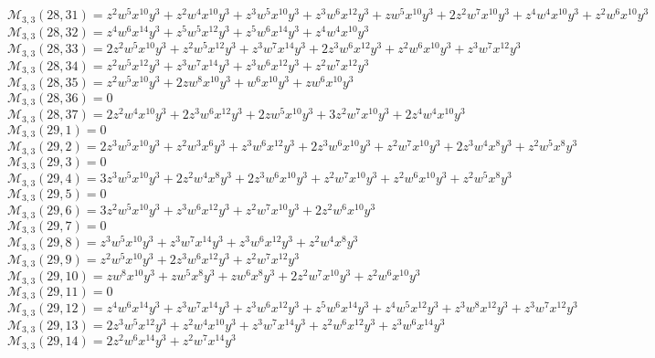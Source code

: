 \documentclass[12pt]{memoireuqam1.3}
\begin{document}
$\mathcal{M}_{3,3}(28,31)=z^2w^5x^{10}y^3+z^2w^4x^{10}y^3+z^3w^5x^{10}y^3+z^3w^6x^{12}y^3+zw^5x^{10}y^3+2z^2w^7x^{10}y^3+z^4w^4x^{10}y^3+z^2w^6x^{10}y^3$\\
$\mathcal{M}_{3,3}(28,32)=z^4w^6x^{14}y^3+z^5w^5x^{12}y^3+z^5w^6x^{14}y^3+z^4w^4x^{10}y^3$\\
$\mathcal{M}_{3,3}(28,33)=2z^2w^5x^{10}y^3+z^2w^5x^{12}y^3+z^3w^7x^{14}y^3+2z^3w^6x^{12}y^3+z^2w^6x^{10}y^3+z^3w^7x^{12}y^3$\\
$\mathcal{M}_{3,3}(28,34)=z^2w^5x^{12}y^3+z^3w^7x^{14}y^3+z^3w^6x^{12}y^3+z^2w^7x^{12}y^3$\\
$\mathcal{M}_{3,3}(28,35)=z^2w^5x^{10}y^3+2zw^8x^{10}y^3+w^6x^{10}y^3+zw^6x^{10}y^3$\\
$\mathcal{M}_{3,3}(28,36)=0$\\
$\mathcal{M}_{3,3}(28,37)=2z^2w^4x^{10}y^3+2z^3w^6x^{12}y^3+2zw^5x^{10}y^3+3z^2w^7x^{10}y^3+2z^4w^4x^{10}y^3$\\
$\mathcal{M}_{3,3}(29,1)=0$\\
$\mathcal{M}_{3,3}(29,2)=2z^3w^5x^{10}y^3+z^2w^3x^6y^3+z^3w^6x^{12}y^3+2z^3w^6x^{10}y^3+z^2w^7x^{10}y^3+2z^3w^4x^8y^3+z^2w^5x^8y^3$\\
$\mathcal{M}_{3,3}(29,3)=0$\\
$\mathcal{M}_{3,3}(29,4)=3z^3w^5x^{10}y^3+2z^2w^4x^8y^3+2z^3w^6x^{10}y^3+z^2w^7x^{10}y^3+z^2w^6x^{10}y^3+z^2w^5x^8y^3$\\
$\mathcal{M}_{3,3}(29,5)=0$\\
$\mathcal{M}_{3,3}(29,6)=3z^2w^5x^{10}y^3+z^3w^6x^{12}y^3+z^2w^7x^{10}y^3+2z^2w^6x^{10}y^3$\\
$\mathcal{M}_{3,3}(29,7)=0$\\
$\mathcal{M}_{3,3}(29,8)=z^3w^5x^{10}y^3+z^3w^7x^{14}y^3+z^3w^6x^{12}y^3+z^2w^4x^8y^3$\\
$\mathcal{M}_{3,3}(29,9)=z^2w^5x^{10}y^3+2z^3w^6x^{12}y^3+z^2w^7x^{12}y^3$\\
$\mathcal{M}_{3,3}(29,10)=zw^8x^{10}y^3+zw^5x^8y^3+zw^6x^8y^3+2z^2w^7x^{10}y^3+z^2w^6x^{10}y^3$\\
$\mathcal{M}_{3,3}(29,11)=0$\\
$\mathcal{M}_{3,3}(29,12)=z^4w^6x^{14}y^3+z^3w^7x^{14}y^3+z^3w^6x^{12}y^3+z^5w^6x^{14}y^3+z^4w^5x^{12}y^3+z^3w^8x^{12}y^3+z^3w^7x^{12}y^3$\\
$\mathcal{M}_{3,3}(29,13)=2z^3w^5x^{12}y^3+z^2w^4x^{10}y^3+z^3w^7x^{14}y^3+z^2w^6x^{12}y^3+z^3w^6x^{14}y^3$\\
$\mathcal{M}_{3,3}(29,14)=2z^2w^6x^{14}y^3+z^2w^7x^{14}y^3$\\
\end{document}
